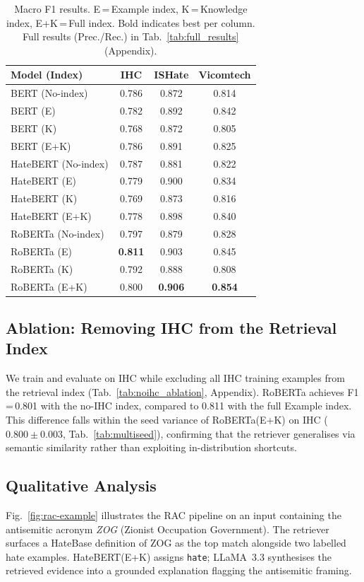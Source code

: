 \documentclass{article}
\begin{document}
\begin{table}[h]
\centering
{\footnotesize
\begin{tabular}{lccc}
\toprule
\textbf{Model (Index)} & \textbf{IHC} & \textbf{ISHate} & \textbf{Vicomtech} \\
\midrule
BERT (No-index)     & 0.786 & 0.872 & 0.814 \\
BERT (E)            & 0.782 & 0.892 & 0.842 \\
BERT (K)            & 0.768 & 0.872 & 0.805 \\
BERT (E+K)          & 0.786 & 0.891 & 0.825 \\
\midrule
HateBERT (No-index) & 0.787 & 0.881 & 0.822 \\
HateBERT (E)        & 0.779 & 0.900 & 0.834 \\
HateBERT (K)        & 0.769 & 0.873 & 0.816 \\
HateBERT (E+K)      & 0.778 & 0.898 & 0.840 \\
\midrule
RoBERTa (No-index)  & 0.797 & 0.879 & 0.828 \\
RoBERTa (E)         & \textbf{0.811} & 0.903 & 0.845 \\
RoBERTa (K)         & 0.792 & 0.888 & 0.808 \\
RoBERTa (E+K)       & 0.800 & \textbf{0.906} & \textbf{0.854} \\
\bottomrule
\end{tabular}}
\captionsetup{font=footnotesize}
\caption{Macro F1 results. E\,=\,Example index, K\,=\,Knowledge index, E+K\,=\,Full index. Bold indicates best per column. Full results (Prec./Rec.) in Tab.~\ref{tab:full_results} (Appendix).}
\label{tab:results}
\vspace{-10pt}
\end{table}


\subsection{Ablation: Removing IHC from the Retrieval Index}
We train and evaluate on IHC while excluding all IHC training examples from the retrieval index (Tab.~\ref{tab:noihc_ablation}, Appendix). RoBERTa achieves F1\,=\,0.801 with the no-IHC index, compared to 0.811 with the full Example index. This difference falls within the seed variance of RoBERTa(E+K) on IHC ($0.800\pm0.003$, Tab.~\ref{tab:multiseed}), confirming that the retriever generalises via semantic similarity rather than exploiting in-distribution shortcuts.


\subsection{Qualitative Analysis}
Fig.~\ref{fig:rac-example} illustrates the RAC pipeline on an input containing the antisemitic acronym \textit{ZOG} (Zionist Occupation Government). The retriever surfaces a HateBase definition of ZOG as the top match alongside two labelled hate examples. HateBERT(E+K) assigns \texttt{hate}; LLaMA~3.3 synthesises the retrieved evidence into a grounded explanation flagging the antisemitic framing.
\end{document}
